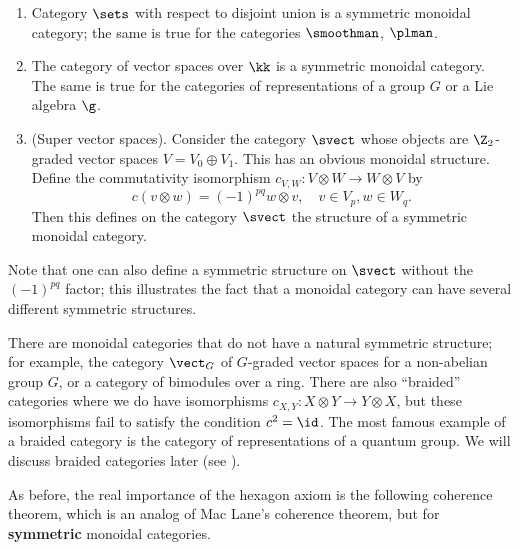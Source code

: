 \begin{example}\label{x:symmetric-monoidal-cats}\par\noindent
  \begin{enumerate}
    \item Category $\sets$ with respect to disjoint union is a
      symmetric monoidal category; the same is true for the categories
      $\smoothman$, $\plman$.
    \item
      The category of vector spaces over $\kk$ is a symmetric monoidal category.
      The same is true for the categories of representations of a group $G$ or
      a Lie algebra $\g$.
    \item (Super vector spaces). Consider the category $\svect$ whose
      objects are $\Z_2$-graded vector spaces $V=V_0\oplus V_1$. This
      has an obvious monoidal structure.
      Define the commutativity isomorphism $c_{V,W}\colon V\otimes W
      \to W\otimes V$ by
      $$
      c(v\otimes w)=(-1)^{pq} w\otimes v, \quad v\in V_p, w\in W_q.
      $$
      Then this defines on the category $\svect$ the structure of a
      symmetric monoidal category.
  \end{enumerate}
\end{example}
Note that one can also define a symmetric structure on $\svect$ without the
$(-1)^{pq}$ factor; this illustrates the fact that a monoidal category can have
several different symmetric structures.
\begin{remark}\label{r:non-symmetric}
  There are monoidal categories that do not have a natural symmetric structure;
  for example, the category $\vect_G$ of $G$-graded vector spaces for a
  non-abelian group $G$, or a category of bimodules over a ring. There are also
  ``braided'' categories where we do have isomorphisms
  $c_{X,Y}\colon X\otimes Y \to Y\otimes X$, but these isomorphisms fail to
  satisfy the condition $c^2=\id$. The most famous example of a braided category
  is the category of representations of a quantum group. We will discuss braided
  categories later (see ).
\end{remark}

As before, the real importance of the hexagon axiom is the following coherence
theorem, which is an analog of Mac Lane's coherence theorem, but for
\textbf{symmetric} monoidal categories.

